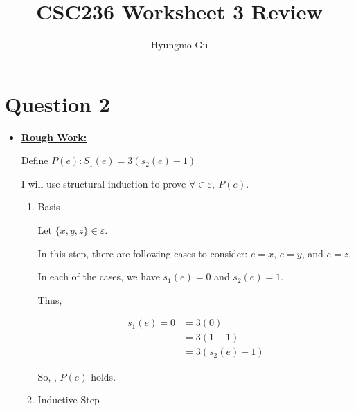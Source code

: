 \documentclass[12pt]{article}
\begin{document}
\title{CSC236 Worksheet 3 Review}
\author{Hyungmo Gu}
\maketitle

\section*{Question 2}
\begin{itemize}
    \item

    \begin{mdframed}
        \underline{\textbf{Rough Work:}}

        \bigskip

        Define $P(e):S_1(e) = 3(s_2(e) - 1)$

        \bigskip

        I will use structural induction to prove $\forall \in \varepsilon,\:P(e)$.

        \bigskip

        \begin{enumerate}[1.]
            \item Basis

            \begin{mdframed}
            Let $\{x,y,z\} \in \varepsilon$.

            \bigskip

            In this step, there are following cases to consider: $e = x$, $e = y$, and $e = z$.

            \bigskip

            In each of the cases, we have $s_1(e) = 0$ and $s_2(e) = 1$.

            \bigskip

            Thus,

            \begin{align}
                s_1(e) = 0 &= 3(0)\\
                &= 3(1-1)\\
                &= 3(s_2(e) - 1)
            \end{align}

            \bigskip

            So, , $P(e)$ holds.
            \end{mdframed}
            \item Inductive Step
        \end{enumerate}

    \end{mdframed}
\end{itemize}
\end{document}
